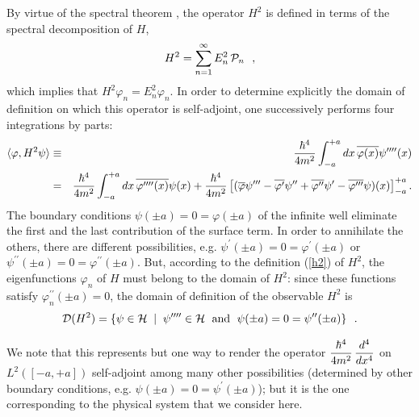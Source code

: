 \documentclass[a4wide,12pt]{report}
\begin{document}
By virtue of the spectral theorem \cite{rs},
the operator $H^2$ is defined in terms of the spectral 
decomposition of  $H$,
\begin{equation}
\label{h2}
H^2 = \sum_{n=1}^{\infty} E_n^2 \, {\cal P}_n
\ \ ,
\end{equation}
which implies that 
$H^2 \varphi_n = E_n^2 \varphi_n$.
In order to determine explicitly the domain of definition on which this
operator 
is self-adjoint, one successively performs four integrations by parts: 
\begin{eqnarray*}
\langle \varphi , H^2 \psi \rangle & \equiv &
\displaystyle{\hbar^4 \over 4m^2} \int_{-a}^{+a} dx \, \overline{\varphi(x)}
\psi^{\prime \prime \prime \prime}(x)
\\
&= &
\displaystyle{\hbar^4 \over 4m^2} \int_{-a}^{+a} dx \, \overline{\varphi^{\prime
\prime \prime \prime}(x)}
\psi (x) +
\displaystyle{\hbar^4 \over 4m^2} \left[
( \overline{\varphi} \psi^{\prime \prime \prime} - \overline{\varphi
^{\prime}} \psi^{\prime \prime} +
\overline{\varphi^{\prime \prime}} \psi^{\prime} -
\overline{\varphi^{\prime \prime\prime}} \psi )(x)
\right]_{-a}^{+a}
.
\end{eqnarray*}
The boundary conditions $\psi (\pm a) =0 = \varphi (\pm a)$
of the infinite well eliminate the first and the last contribution of the
surface term. In order to annihilate the others, there are 
different possibilities, e.g. 
$\psi^{\prime} (\pm a) =0 = \varphi^{\prime} (\pm a)$ or
$\psi^{\prime \prime} (\pm a) =0 = \varphi^{\prime \prime} (\pm a)$.
But, according to the definition (\ref{h2}) of $H^2$,
the eigenfunctions $\varphi_n$ of $H$ must belong to the domain 
of $H^2$: since these functions satisfy 
$\varphi_n ^{\prime \prime}
(\pm a)=0$, the  domain of definition of the observable $H^2$ is 
\begin{equation}
\label{dh2}
{\cal D} (H^2) = \{ \psi \in {\cal H} \; \mid \; \psi^{\prime \prime
\prime \prime}
\in {\cal H} \ \; {\rm and} \ \; \psi(\pm a) =0 = \psi^{\prime \prime}
(\pm a) \}
\ \ .
\end{equation}
 
 We note that this represents but one way to render the operator 
$\displaystyle{\hbar^4 \over 4m^2} \, \displaystyle{d^4 \over dx^4}$ 
on $L^2 ([-a,+a])$
self-adjoint among many other possibilities 
(determined by other boundary conditions,
e.g.  $\psi (\pm a ) = 0 = \psi^{\prime} (\pm a)$); 
but it is the one corresponding to the   
physical system that we consider here. 
\end{document}
